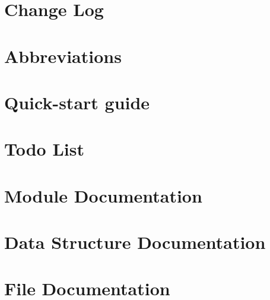 \documentclass[twoside]{article}
\begin{document}
\section{Change Log}
\label{changelog}
\hypertarget{changelog}{}

\section{Abbreviations}
\label{abbreviation}
\hypertarget{abbreviation}{}

\section{Quick-\/start guide}
\label{md__home_nenad_git_nradulovic_esolid-kernel_README}
\hypertarget{md__home_nenad_git_nradulovic_esolid-kernel_README}{}

\section{Todo List}
\label{todo}
\hypertarget{todo}{}

\section{Module Documentation}
























\section{Data Structure Documentation}











\section{File Documentation}















\newpage
{}
{}
\printindex
\end{document}
